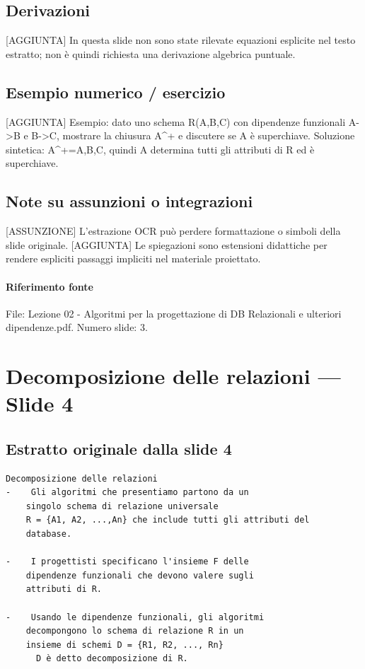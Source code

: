 \documentclass[11pt]{article}
\begin{document}
\subsection*{Derivazioni}
[AGGIUNTA] In questa slide non sono state rilevate equazioni esplicite nel testo estratto; non è quindi richiesta una derivazione algebrica puntuale.
\subsection*{Esempio numerico / esercizio}
[AGGIUNTA] Esempio: dato uno schema R(A,B,C) con dipendenze funzionali A->B e B->C, mostrare la chiusura A^+ e discutere se A è superchiave. Soluzione sintetica: A^+={A,B,C}, quindi A determina tutti gli attributi di R ed è superchiave.
\subsection*{Note su assunzioni o integrazioni}
[ASSUNZIONE] L'estrazione OCR può perdere formattazione o simboli della slide originale.
[AGGIUNTA] Le spiegazioni sono estensioni didattiche per rendere espliciti passaggi impliciti nel materiale proiettato.
\paragraph{Riferimento fonte} File: Lezione 02 - Algoritmi per la progettazione di DB Relazionali e ulteriori dipendenze.pdf. Numero slide: 3.
\section{Decomposizione delle relazioni --- Slide 4}
\subsection*{Estratto originale dalla slide 4}
\begin{lstlisting}
Decomposizione delle relazioni
-    Gli algoritmi che presentiamo partono da un
    singolo schema di relazione universale
    R = {A1, A2, ...,An} che include tutti gli attributi del
    database.

-    I progettisti specificano l'insieme F delle
    dipendenze funzionali che devono valere sugli
    attributi di R.

-    Usando le dipendenze funzionali, gli algoritmi
    decompongono lo schema di relazione R in un
    insieme di schemi D = {R1, R2, ..., Rn}
      D è detto decomposizione di R.
\end{lstlisting}
\end{document}
